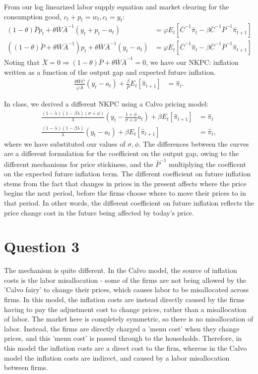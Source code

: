 \documentclass[11pt]{article} %
\begin{document}
From our log linearized labor supply equation and market clearing for the consumption good, $c_t + p_t = w_t, c_t = y_t$:
\begin{align*}
(1-\theta)\bar{P}p_t + \theta\bar{W}\bar{A}^{-1}(y_t + p_t - a_t) &= \varphi E_t[ \bar{C}^{-1}\hat{\pi}_t -  \beta\bar{C}^{-1}\bar{P}^{-1}\hat{\pi}_{t+1}]\\
((1-\theta)\bar{P} + \theta\bar{W}\bar{A}^{-1} )p_t + \theta\bar{W}\bar{A}^{-1}(y_t - a_t) &= \varphi E_t[\bar{C}^{-1}\hat{\pi}_t -  \beta\bar{C}^{-1}\bar{P}^{-1}\hat{\pi}_{t+1} ]
\end{align*}
Noting that $\bar{X} = 0 \Rightarrow (1-\theta)\bar{P} + \theta\bar{W}\bar{A}^{-1} = 0$, we have our NKPC: inflation written as a function of the output gap and expected future inflation.
\begin{align}
 \frac{\theta\bar{W}\bar{C}}{\varphi\bar{A}}(y_t - a_t) + \frac{\beta}{\bar{P}}E_t[\hat{\pi}_{t+1} ] &=\hat{\pi}_t. \label{NKPC}
\end{align}

In class, we derived a different NKPC using a Calvo pricing model:
\begin{align*}
\frac{(1-\lambda)(1-\beta\lambda)(\sigma + \phi)}{\lambda}\left(y_t - \frac{1+\phi}{\sigma + \phi}a_t\right) + \beta E_{t}[ \hat{\pi}_{t+1}] &= \hat{\pi}_t\\
\frac{(1-\lambda)(1-\beta\lambda)}{\lambda}\left(y_t -a_t\right) + \beta E_{t}[ \hat{\pi}_{t+1}] &= \hat{\pi}_t,
\end{align*}
where we have substituted our values of $\sigma,\phi$. The differences between the curves are a different formulation for the coefficient on the output gap, owing to the different mechanisms for price stickiness, and the $\bar{P}^{-1}$ multiplying the coefficent on the expected future inflation term. The different coefficient on future inflation stems from the fact that changes in prices in the present affects where the price begins the next period, before the firms choose where to move their prices to in that period. In other words, the different coefficient on future inflation reflects the price change cost in the future being affected by today's price.
\section{Question 3}
The mechanism is quite different. In the Calvo model, the source of inflation costs is the labor misallocation - some of the firms are not being allowed by the 'Calvo fairy' to change their prices, which causes labor to be misallocated across firms. In this model, the inflation costs are instead directly caused by the firms having to pay the adjustment cost to change prices, rather than a misallocation of labor. The market here is completely symmetric, so there is no misallocation of labor. Instead, the firms are directly charged a 'menu cost' when they change prices, and this 'menu cost' is passed through to the households. Therefore, in this model the inflation costs are a direct cost to the firm, whereas in the Calvo model the inflation costs are indirect, and caused by a labor misallocation between firms.
\end{document}
